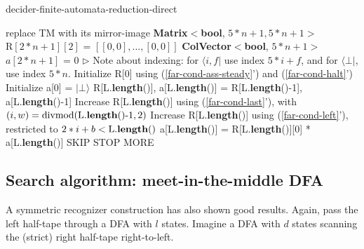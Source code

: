 \begin{algorithm}
  \caption{{\sc decider-finite-automata-reduction-direct}}\label{alg:finite-automata-reduction-direct}

  \begin{algorithmic}[1]
       replace TM with its mirror-image
      \EndIf
      \State \textbf{Matrix$\boldsymbol<$bool}, $5*n+1, 5*n+1\boldsymbol>$ $\textrm{R}[2*n+1][2]$ = $[[0,0],\ldots,[0,0]]$
      \State \textbf{ColVector$\boldsymbol<$bool}, $5*n+1\boldsymbol>$ $a[2*n+1]$ = 0
      \State \(\triangleright\) Note about indexing: for $\langle i,f\vert$ use index $5*i+f$, and for $\langle\bot\vert$, use index $5*n$.
      \State Initialize R[0] using (\ref{far-cond-ass-steady}') and (\ref{far-cond-halt}')
      \State Initialize a[0] = $\vert\bot\rangle$
        \State R[L.\textbf{length}()], a[L.\textbf{length}()] = R[L.\textbf{length}()-1], a[L.\textbf{length}()-1]
        \State Increase R[L.\textbf{length}()] using (\ref{far-cond-last}'), with $(i,w)=\operatorname{divmod}(\textrm{L.\textbf{length}()-1}, 2)$
        \Repeat
          \State Increase R[L.\textbf{length}()] using (\ref{far-cond-left}'), restricted to $2*i+b<\textrm{L.\textbf{length}()}$
        \Repeat
          \State a[L.\textbf{length}()] = R[L.\textbf{length}()][0] * a[L.\textbf{length}()]
          \Return SKIP
          \Return STOP
        \Else\;\Return MORE
        \EndIf
      \EndProcedure
      \State \Return {}
    \EndProcedure
  \end{algorithmic}
\end{algorithm}


\subsection{Search algorithm: meet-in-the-middle DFA}
\label{far-algo-mtim_dfa}
A symmetric recognizer construction has also shown good results.
Again, pass the left half-tape through a DFA with $l$ states.
Imagine a DFA with $d$ states scanning the (strict) right half-tape right-to-left.

